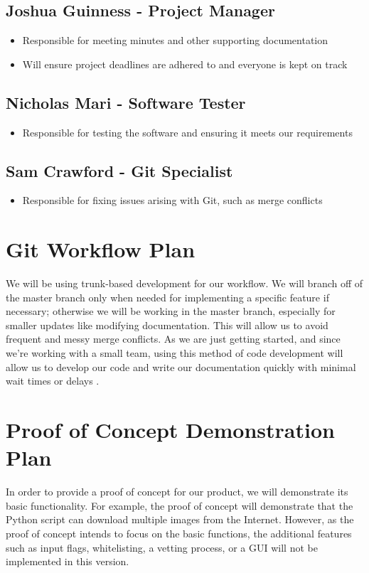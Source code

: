 \documentclass{article}
\begin{document}
\subsection{Joshua Guinness - Project Manager}
\begin{itemize}
\item Responsible for meeting minutes and other supporting documentation
\item Will ensure project deadlines are adhered to and everyone is kept on track
\end{itemize}

\subsection{Nicholas Mari - Software Tester}
\begin{itemize}
\item Responsible for testing the software and ensuring it meets our requirements
\end{itemize}

\subsection{Sam Crawford - Git Specialist}
\begin{itemize}
\item Responsible for fixing issues arising with Git, such as merge conflicts 
\end{itemize}

\section{Git Workflow Plan}
We will be using trunk-based development for our workflow. We will branch off 
of the master branch only when needed for implementing a specific feature if 
necessary; otherwise we will be working in the master branch, especially for 
smaller updates like modifying documentation. This will allow us to avoid 
frequent and messy merge conflicts. As we are just getting started, and since 
we’re working with a small team, using this method of code development will 
allow us to develop our code and write our documentation quickly with minimal 
wait times or delays \cite{trunkbased}.

\section{Proof of Concept Demonstration Plan}
In order to provide a proof of concept for our product, we will demonstrate its 
basic functionality. For example, the proof of concept will demonstrate that the 
Python script can download multiple images from the Internet. However, as the 
proof of concept intends to focus on the basic functions, the additional 
features such as input flags, whitelisting, a vetting process, or a GUI will not 
be implemented in this version.
\end{document}
